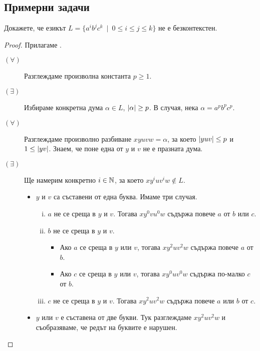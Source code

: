 \subsection{Примерни задачи}

\begin{extra}
\begin{problem}
  Докажете, че езикът $L = \{a^ib^jc^k\ \mid\ 0 \leq i \leq j \leq k\}$ не е безконтекстен.
\end{problem}
\begin{proof}
  Прилагаме .
  \begin{description}
  \item[$(\forall)$]
     Разглеждаме произволна константа $p \geq 1$.
   \item[$(\exists)$]
     Избираме конкретна дума $\alpha \in L$, $\vert{\alpha}\vert \geq p$.
     В случая, нека $\alpha = a^pb^pc^p$.
   \item[$(\forall)$]
     Разглеждаме произволно разбиване $xyuvw = \alpha$, за което $\vert{yuv}\vert \leq p$ и $1 \leq \vert{yv}\vert$.
     Знаем, че поне една от $y$ и $v$ не е празната дума.
   \item[$(\exists)$] Ще намерим конкретно $i \in \mathbb{N}$, за което $xy^iuv^iw \not\in L$.
    \begin{itemize}
    \item
      $y$ и $v$ са съставени от една буква.
      Имаме три случая.
      \begin{enumerate}[i)]
      \item
        $a$ не се среща в $y$ и $v$.
        Тогава $xy^0vu^0w$ съдържа повече $a$ от $b$ или $c$.
      \item
        $b$ не се среща в $y$ и $v$.
        \begin{itemize}
        \item 
          Ако $a$ се среща в $y$ или $v$, тогава $xy^2uv^2w$ съдържа повече $a$ от $b$.
        \item
          Ако $c$ се среща в $y$ или $v$, тогава $xy^0uv^0w$ съдържа по-малко $c$ от $b$.
        \end{itemize}
      \item
        $c$ не се среща в $y$ и $v$.
        Тогава $xy^2uv^2w$ съдържа повече $a$ или $b$ от $c$.
      \end{enumerate}      
     \item
       $y$ или $v$ е съставена от две букви.
       Тук разглеждаме $xy^2uv^2w$ и съобразяваме, че редът на буквите е нарушен.
     \end{itemize}    
   \end{description}
\end{proof}


\end{extra}
